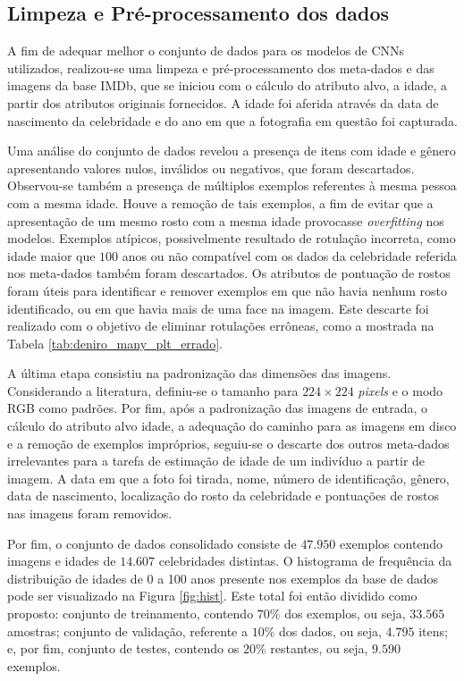 \subsection{Limpeza e Pré-processamento dos dados}

A fim de adequar melhor o conjunto de dados para os modelos de CNNs utilizados, realizou-se uma limpeza e pré-processamento dos meta-dados e das imagens da base IMDb, que se iniciou com o cálculo do atributo alvo, a idade, a partir dos atributos originais fornecidos. A idade foi aferida através da data de nascimento da celebridade e do ano em que a fotografia em questão foi capturada.

Uma análise do conjunto de dados revelou a presença de itens com idade e gênero apresentando valores nulos, inválidos ou negativos, que foram descartados. Observou-se também a presença de múltiplos exemplos referentes à mesma pessoa com a mesma idade. Houve a remoção de tais exemplos, a fim de evitar que a apresentação de um mesmo rosto com a mesma idade provocasse \emph{overfitting} nos modelos. Exemplos atípicos, possivelmente resultado de rotulação incorreta, como idade maior que $100$ anos ou não compatível com os dados da celebridade referida nos meta-dados também foram descartados. Os atributos de pontuação de rostos foram úteis para identificar e remover exemplos em que não havia nenhum rosto identificado, ou em que havia mais de uma face na imagem. Este descarte foi realizado com o objetivo de eliminar rotulações errôneas, como a mostrada na Tabela \ref{tab:deniro_many_plt_errado}.

A última etapa consistiu na padronização das dimensões das imagens. Considerando a literatura, definiu-se o tamanho para $224 \times 224$ \emph{pixels} e o modo RGB como padrões. Por fim, após a padronização das imagens de entrada, o cálculo do atributo alvo idade, a adequação do caminho para as imagens em disco e a remoção de exemplos impróprios, seguiu-se o descarte dos outros meta-dados irrelevantes para a tarefa de estimação de idade de um indivíduo a partir de imagem. A data em que a foto foi tirada, nome, número de identificação, gênero, data de nascimento, localização do rosto da celebridade e pontuações de rostos nas imagens foram removidos.

Por fim, o conjunto de dados consolidado consiste de $47.950$ exemplos contendo imagens e idades de $14.607$ celebridades distintas. O histograma de frequência da distribuição de idades de 0 a 100 anos presente nos exemplos da base de dados pode ser visualizado na Figura \ref{fig:hist}. Este total foi então dividido como proposto: conjunto de treinamento, contendo $70\%$ dos exemplos, ou seja, $33.565$ amostras; conjunto de validação, referente a $10\%$ dos dados, ou seja, $4.795$ itens; e, por fim, conjunto de testes, contendo os $20\%$ restantes, ou seja, $9.590$ exemplos.


